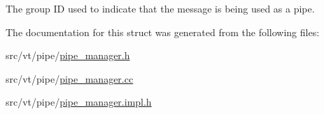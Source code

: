 The group ID used to indicate that the message is being used as a pipe. 



The documentation for this struct was generated from the following files\+:\begin{DoxyCompactItemize}
\item 
src/vt/pipe/\hyperlink{pipe__manager_8h}{pipe\+\_\+manager.\+h}\item 
src/vt/pipe/\hyperlink{pipe__manager_8cc}{pipe\+\_\+manager.\+cc}\item 
src/vt/pipe/\hyperlink{pipe__manager_8impl_8h}{pipe\+\_\+manager.\+impl.\+h}\end{DoxyCompactItemize}
